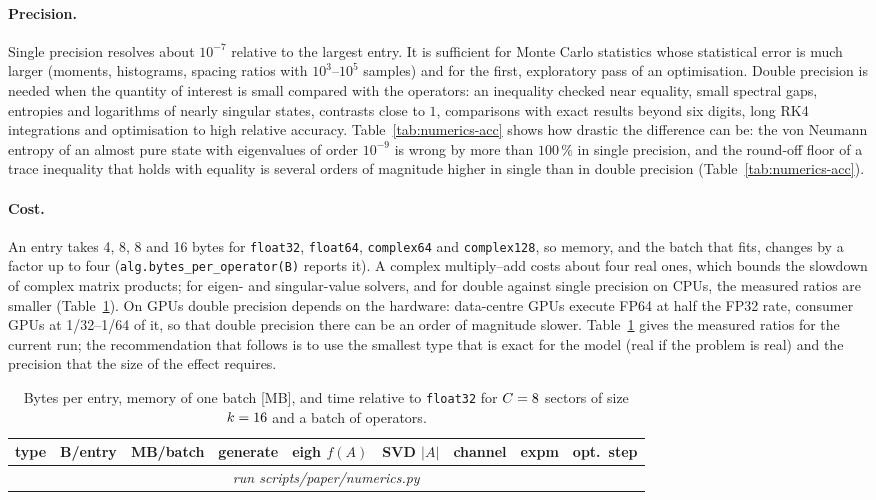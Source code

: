 \documentclass[11pt]{article}
\providecommand{\NumTimeRows}{\multicolumn{9}{c}{\emph{run scripts/paper/numerics.py}}\\}
\providecommand{\NumTimeHeader}{generate & eigh $f(A)$ & SVD $|A|$ & channel & expm & opt.\ step}
\begin{document}
\paragraph{Precision.} Single precision resolves about $10^{-7}$ relative to the largest entry. It is
sufficient for Monte Carlo statistics whose statistical error is much larger (moments, histograms,
spacing ratios with $10^3$--$10^5$ samples) and for the first, exploratory pass of an optimisation.
Double precision is needed when the quantity of interest is small compared with the operators: an
inequality checked near equality, small spectral gaps, entropies and logarithms of nearly singular
states, contrasts close to $1$, comparisons with exact results beyond six digits, long RK4 integrations
and optimisation to high relative accuracy. Table~\ref{tab:numerics-acc} shows how drastic the
difference can be: the von Neumann entropy of an almost pure state with eigenvalues of order $10^{-9}$ is
wrong by more than $100\,\%$ in single precision, and the round-off floor of a trace inequality that
holds with equality is several orders of magnitude higher in single than in double precision (Table~\ref{tab:numerics-acc}).

\paragraph{Cost.} An entry takes 4, 8, 8 and 16 bytes for \texttt{float32}, \texttt{float64},
\texttt{complex64} and \texttt{complex128}, so memory, and the batch that fits, changes by a factor up to four
(\texttt{alg.bytes\_per\_operator(B)} reports it). A complex multiply--add costs about four real ones, which bounds the
slowdown of complex matrix products; for eigen- and singular-value solvers, and for double against single precision
on CPUs, the measured ratios are smaller (Table~\ref{tab:numerics-time}). On GPUs double precision depends on the
hardware: data-centre GPUs execute
FP64 at half the FP32 rate, consumer GPUs at 1/32--1/64 of it, so that double precision there can be an
order of magnitude slower. Table~\ref{tab:numerics-time} gives the measured ratios for the current run;
the recommendation that follows is to use the smallest type that is exact for the model (real if the
problem is real) and the precision that the size of the effect requires.

\begin{table}[h]
\centering\small
\begin{tabular}{lrrrrrrrr}
\toprule
type & B/entry & MB/batch & \NumTimeHeader\\
\midrule
\NumTimeRows
\bottomrule
\end{tabular}
\caption{Bytes per entry, memory of one batch [MB], and time relative to \texttt{float32} for $C=\IfFileExists{generated/numerics.tex}{\NumC}{8}$
sectors of size $k=\IfFileExists{generated/numerics.tex}{\NumK}{16}$ and a batch of
 operators.}
\label{tab:numerics-time}
\end{table}
\end{document}
